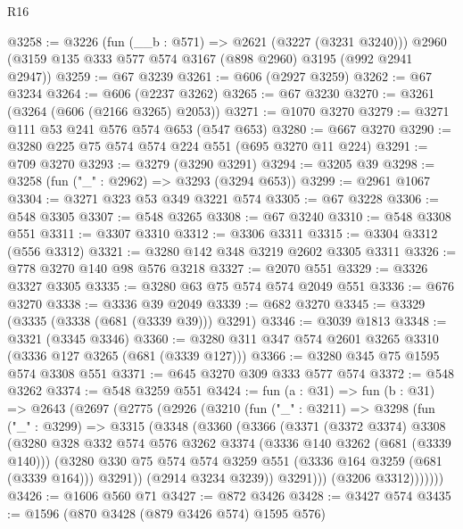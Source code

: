 \begin{lexlean}{R16}
\begin{coremodule}
@3258 := @3226
    (fun (__b : @571) => @2621 (@3227 (@3231 @3240)))
    @2960
    (@3159 @135 @333 @577 @574 @3167 (@898 @2960) @3195 (@992 @2941 @2947))
@3259 := @67 @3239
@3261 := @606 (@2927 @3259)
@3262 := @67 @3234
@3264 := @606 (@2237 @3262)
@3265 := @67 @3230
@3270 := @3261 (@3264 (@606 (@2166 @3265) @2053))
@3271 := @1070 @3270
@3279 := @3271 @111 @53 @241 @576 @574 @653 (@547 @653)
@3280 := @667 @3270
@3290 := @3280 @225 @75 @574 @574 @224 @551 (@695 @3270 @11 @224)
@3291 := @709 @3270
@3293 := @3279 (@3290 @3291)
@3294 := @3205 @39
@3298 := @3258 (fun ("_" : @2962) => @3293 (@3294 @653))
@3299 := @2961 @1067
@3304 := @3271 @323 @53 @349 @3221 @574
@3305 := @67 @3228
@3306 := @548 @3305
@3307 := @548 @3265
@3308 := @67 @3240
@3310 := @548 @3308 @551
@3311 := @3307 @3310
@3312 := @3306 @3311
@3315 := @3304 @3312 (@556 @3312)
@3321 := @3280 @142 @348 @3219 @2602 @3305 @3311
@3326 := @778 @3270 @140 @98 @576 @3218
@3327 := @2070 @551
@3329 := @3326 @3327 @3305
@3335 := @3280 @63 @75 @574 @574 @2049 @551
@3336 := @676 @3270
@3338 := @3336 @39 @2049
@3339 := @682 @3270
@3345 := @3329 (@3335 (@3338 (@681 (@3339 @39))) @3291)
@3346 := @3039 @1813
@3348 := @3321 (@3345 @3346)
@3360 := @3280 @311 @347 @574 @2601 @3265 @3310 (@3336 @127 @3265 (@681 (@3339 @127)))
@3366 := @3280 @345 @75 @1595 @574 @3308 @551
@3371 := @645 @3270 @309 @333 @577 @574
@3372 := @548 @3262
@3374 := @548 @3259 @551
@3424 := fun (a : @31) =>
  fun (b : @31) =>
  @2643
    (@2697
      (@2775
        (@2926
          (@3210
            (fun ("_" : @3211) =>
            @3298
              (fun ("_" : @3299) =>
              @3315
                (@3348
                  (@3360
                    (@3366
                      (@3371
                        (@3372 @3374)
                        @3308
                        (@3280
                          @328
                          @332
                          @574
                          @576
                          @3262
                          @3374
                          (@3336 @140 @3262 (@681 (@3339 @140)))
                          (@3280
                            @330
                            @75
                            @574
                            @574
                            @3259
                            @551
                            (@3336 @164 @3259 (@681 (@3339 @164)))
                            @3291))
                        (@2914 @3234 @3239))
                      @3291)))
                (@3206 @3312)))))))
@3426 := @1606 @560 @71
@3427 := @872 @3426
@3428 := @3427 @574
@3435 := @1596 (@870 @3428 (@879 @3426 @574) @1595 @576)

\end{coremodule}
\end{lexlean}
